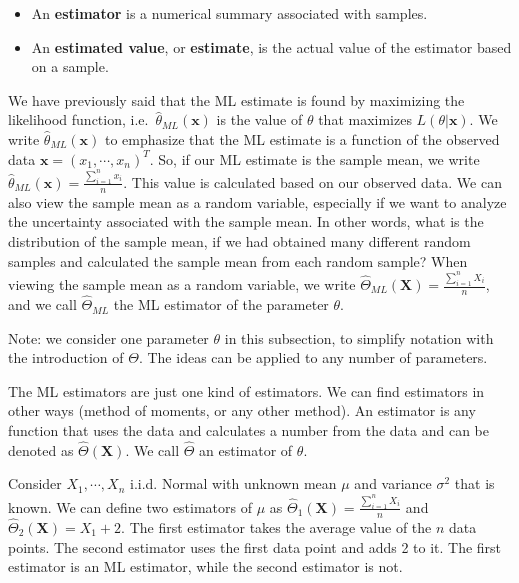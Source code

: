 \documentclass[
]{book}
\begin{document}
\begin{itemize}
\item
  An \textbf{estimator} is a numerical summary associated with samples.
\item
  An \textbf{estimated value}, or \textbf{estimate}, is the actual value of the estimator based on a sample.
\end{itemize}

We have previously said that the ML estimate is found by maximizing the likelihood function, i.e.~\(\hat{\theta}_{ML}(\boldsymbol{x})\) is the value of \(\theta\) that maximizes \(L(\theta| \boldsymbol{x})\). We write \(\hat{\theta}_{ML}(\boldsymbol{x})\) to emphasize that the ML estimate is a function of the observed data \(\boldsymbol{x} = (x_1,\cdots, x_n)^T\). So, if our ML estimate is the sample mean, we write \(\hat{\theta}_{ML}(\boldsymbol{x}) = \frac{\sum_{i=1}^n x_i}{n}\). This value is calculated based on our observed data.
We can also view the sample mean as a random variable, especially if we want to analyze the uncertainty associated with the sample mean. In other words, what is the distribution of the sample mean, if we had obtained many different random samples and calculated the sample mean from each random sample? When viewing the sample mean as a random variable, we write \(\hat{\Theta}_{ML}(\boldsymbol{X}) = \frac{\sum_{i=1}^n X_i}{n}\), and we call \(\hat{\Theta}_{ML}\) the ML estimator of the parameter \(\theta\).

Note: we consider one parameter \(\theta\) in this subsection, to simplify notation with the introduction of \(\Theta\). The ideas can be applied to any number of parameters.

The ML estimators are just one kind of estimators. We can find estimators in other ways (method of moments, or any other method). An estimator is any function that uses the data and calculates a number from the data and can be denoted as \(\hat{\Theta}(\boldsymbol{X})\). We call \(\hat{\Theta}\) an estimator of \(\theta\).

Consider \(X_1, \cdots, X_n\) i.i.d. Normal with unknown mean \(\mu\) and variance \(\sigma^2\) that is known. We can define two estimators of \(\mu\) as \(\hat{\Theta}_1(\boldsymbol{X}) = \frac{\sum_{i=1}^n X_i}{n}\) and \(\hat{\Theta}_2(\boldsymbol{X}) = X_1 + 2\). The first estimator takes the average value of the \(n\) data points. The second estimator uses the first data point and adds 2 to it. The first estimator is an ML estimator, while the second estimator is not.
\end{document}

